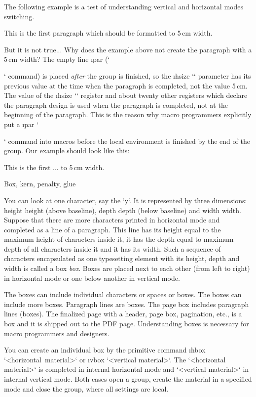 The following example is a test of understanding vertical and horizontal
modes switching. 

\begtt
{\hsize=5cm This is the first paragraph which should be formatted 
            to 5\,cm width.}

But it is not true...
\endtt
%
Why does the example above not create the paragraph with a 5\,cm width?
The empty line \i par (`\par` command) is placed {\em after} the group is finished, so the
\i hsize `\hsize` parameter has its previous value at the time when the paragraph is
completed, not the value 5\,cm. The value of the \i hsize `\hsize` register\fnote
{and about twenty other registers which declare the paragraph design}
is used when the paragraph is
completed, not at the beginning of the paragraph. This is the reason why
macro programmers explicitly put a \i par `\par` command into macros before the local
environment is finished by the end of the group. Our example should look like this:

\begtt
{\hsize=5cm This is the first ... to 5\,cm width.\par}
\endtt


\sec[boxes] Box, kern, penalty, glue

You can look at one character, say the `y`. It is represented by three
dimensions: \ii height height (above baseline), \ii depth depth (below baseline) 
and \ii width width.
Suppose that there are more characters printed in horizontal mode and
completed as a line of a paragraph. This line has its height equal to
the maximum height of characters inside it, it has the depth equal to maximum
depth of all characters inside it and it has its width. Such a sequence of
characters encapsulated as one typesetting element
with its height, depth and width is
called a \ii box {\em box}. Boxes are placed next to each other (from left to
right)
in horizontal mode or one below another in vertical mode. 

The boxes can include individual characters or spaces or boxes. The boxes can
include more boxes. Paragraph lines are boxes. The page box includes paragraph
lines (boxes). The finalized page with a header, page box, pagination,
etc., is a box and it is shipped out to the PDF page. Understanding boxes is
necessary for macro programmers and designers.

You can create an individual box by the primitive command
\i hbox `\hbox{<horizontal material>}`
or \i vbox `\vbox{<vertical material>}`. The `<horizontal material>` is completed in
internal horizontal mode and `<vertical material>` in internal vertical
mode. Both cases open a group, create the material in a specified
mode and close the group, where all settings are local.

